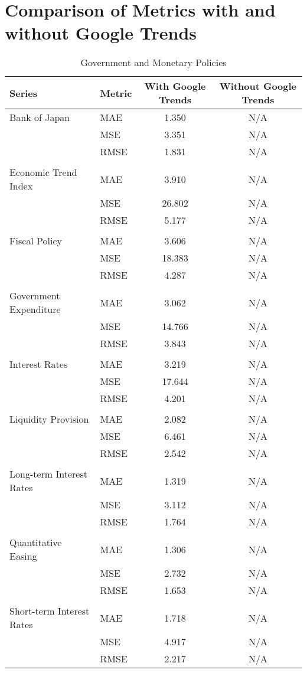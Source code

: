 \documentclass[a4paper,12pt]{article}
\begin{document}
\section*{Comparison of Metrics with and without Google Trends}

\begin{table}
\caption{Government and Monetary Policies}
\label{tab:metrics_comparison_Government_and_Monetary_Policies}
\begin{tabular}{llcc}
\toprule
Series & Metric & With Google Trends & Without Google Trends \\
\midrule
Bank of Japan & MAE & 1.350 & N/A \\
 & MSE & 3.351 & N/A \\
 & RMSE & 1.831 & N/A \\
\arrayrulecolor{black!30}\midrule &  &  &  \\
Economic Trend Index & MAE & 3.910 & N/A \\
 & MSE & 26.802 & N/A \\
 & RMSE & 5.177 & N/A \\
\arrayrulecolor{black!30}\midrule &  &  &  \\
Fiscal Policy & MAE & 3.606 & N/A \\
 & MSE & 18.383 & N/A \\
 & RMSE & 4.287 & N/A \\
\arrayrulecolor{black!30}\midrule &  &  &  \\
Government Expenditure & MAE & 3.062 & N/A \\
 & MSE & 14.766 & N/A \\
 & RMSE & 3.843 & N/A \\
\arrayrulecolor{black!30}\midrule &  &  &  \\
Interest Rates & MAE & 3.219 & N/A \\
 & MSE & 17.644 & N/A \\
 & RMSE & 4.201 & N/A \\
\arrayrulecolor{black!30}\midrule &  &  &  \\
Liquidity Provision & MAE & 2.082 & N/A \\
 & MSE & 6.461 & N/A \\
 & RMSE & 2.542 & N/A \\
\arrayrulecolor{black!30}\midrule &  &  &  \\
Long-term Interest Rates & MAE & 1.319 & N/A \\
 & MSE & 3.112 & N/A \\
 & RMSE & 1.764 & N/A \\
\arrayrulecolor{black!30}\midrule &  &  &  \\
Quantitative Easing & MAE & 1.306 & N/A \\
 & MSE & 2.732 & N/A \\
 & RMSE & 1.653 & N/A \\
\arrayrulecolor{black!30}\midrule &  &  &  \\
Short-term Interest Rates & MAE & 1.718 & N/A \\
 & MSE & 4.917 & N/A \\
 & RMSE & 2.217 & N/A \\
\bottomrule
\end{tabular}
\end{table}
\end{document}
